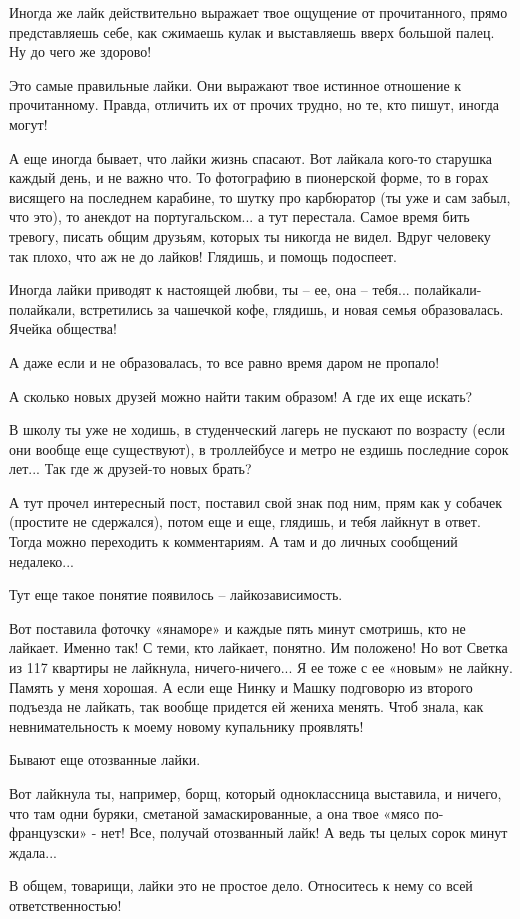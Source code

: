 Иногда же лайк действительно выражает твое ощущение от прочитанного, прямо
представляешь себе, как сжимаешь кулак и выставляешь вверх большой палец. Ну до
чего же здорово!

Это самые правильные лайки. Они выражают твое истинное отношение к
прочитанному. Правда, отличить их от прочих трудно, но те, кто пишут, иногда
могут!

А еще иногда бывает, что лайки жизнь спасают. Вот лайкала кого-то старушка
каждый день, и не важно что. То фотографию в пионерской форме, то в горах
висящего на последнем карабине, то шутку про карбюратор (ты уже и сам забыл,
что это), то анекдот на португальском... а тут перестала. Самое время бить
тревогу, писать общим друзьям, которых ты никогда не видел. Вдруг человеку так
плохо, что аж не до лайков! Глядишь, и помощь подоспеет.

Иногда лайки приводят к настоящей любви, ты – ее, она – тебя...
полайкали-полайкали, встретились за чашечкой кофе, глядишь, и новая семья
образовалась. Ячейка общества!

А даже если и не образовалась, то все равно время даром не пропало!

А сколько новых друзей можно найти таким образом! А где их еще искать?

В школу ты уже не ходишь, в студенческий лагерь не пускают по возрасту (если
они вообще еще существуют), в троллейбусе и метро не ездишь последние сорок
лет... Так где ж друзей-то новых брать?

А тут прочел интересный пост, поставил свой знак под ним, прям как у собачек
(простите не сдержался), потом еще и еще, глядишь, и тебя лайкнут в ответ.
Тогда можно переходить к комментариям. А там и до личных сообщений недалеко...

Тут еще такое понятие появилось – лайкозависимость.

Вот поставила фоточку «янаморе» и каждые пять минут смотришь, кто не лайкает.
Именно так! С теми, кто лайкает, понятно. Им положено! Но вот Светка из 117
квартиры не лайкнула, ничего-ничего... Я ее тоже с ее «новым» не лайкну. Память
у меня хорошая. А если еще Нинку и Машку подговорю из второго подъезда не
лайкать, так вообще придется ей жениха менять. Чтоб знала, как невнимательность
к моему новому купальнику проявлять!

Бывают еще отозванные лайки.

Вот лайкнула ты, например, борщ, который одноклассница выставила, и ничего, что
там одни буряки, сметаной замаскированные, а она твое «мясо по-французски» -
нет! Все, получай отозванный лайк! А ведь ты целых сорок минут ждала...

В общем, товарищи, лайки это не простое дело. Относитесь к нему со всей
ответственностью!

